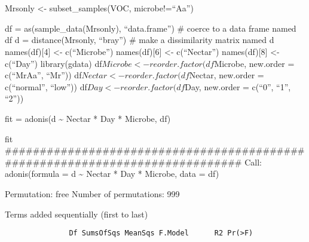 \documentclass[]{article}
\begin{document}
\subsection{}\label{section-8}

\section{}\label{section-9}

\section{}\label{section-10}

\subsection{}\label{section-11}

\subsubsection{}\label{section-12}

Mrsonly \textless{}- subset\_samples(VOC, microbe!=``Aa'')

df = as(sample\_data(Mrsonly), ``data.frame'') \# coerce to a data frame
named df d = distance(Mrsonly, ``bray'') \# make a dissimilarity matrix
named d names(df){[}4{]} \textless{}- c(``Microbe'') names(df){[}6{]}
\textless{}- c(``Nectar'') names(df){[}8{]} \textless{}- c(``Day'')
library(gdata) df\(Microbe <- reorder.factor(df\)Microbe, new.order =
c(``MrAa'', ``Mr'')) df\(Nectar <- reorder.factor(df\)Nectar, new.order
= c(``normal'', ``low'')) df\(Day <- reorder.factor(df\)Day, new.order =
c(``0'', ``1'', ``2''))

fit = adonis(d \textasciitilde{} Nectar * Day * Microbe, df)

fit
\#\#\#\#\#\#\#\#\#\#\#\#\#\#\#\#\#\#\#\#\#\#\#\#\#\#\#\#\#\#\#\#\#\#\#\#\#\#\#\#\#\#\#\#\#\#\#\#\#\#\#\#\#\#\#\#\#\#\#\#\#\#\#\#\#\#\#\#\#\#\#\#\#\#\#\#\#
Call: adonis(formula = d \textasciitilde{} Nectar * Day * Microbe, data
= df)

Permutation: free Number of permutations: 999

Terms added sequentially (first to last)

\begin{verbatim}
               Df SumsOfSqs MeanSqs F.Model      R2 Pr(>F)    
\end{verbatim}
\end{document}

